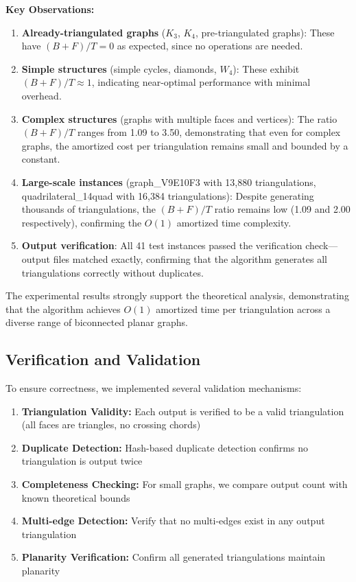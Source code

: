 \documentclass[12pt,a4paper]{article}
\theoremstyle{definition}
\theoremstyle{remark}
\begin{document}
\textbf{Key Observations:}
\begin{enumerate}
    \item \textbf{Already-triangulated graphs} ($K_3$, $K_4$, pre-triangulated graphs): These have $(B+F)/T = 0$ as expected, since no operations are needed.
    
    \item \textbf{Simple structures} (simple cycles, diamonds, $W_4$): These exhibit $(B+F)/T \approx 1$, indicating near-optimal performance with minimal overhead.
    
    \item \textbf{Complex structures} (graphs with multiple faces and vertices): The ratio $(B+F)/T$ ranges from 1.09 to 3.50, demonstrating that even for complex graphs, the amortized cost per triangulation remains small and bounded by a constant.
    
    \item \textbf{Large-scale instances} (graph\_V9E10F3 with 13,880 triangulations, quadrilateral\_14quad with 16,384 triangulations): Despite generating thousands of triangulations, the $(B+F)/T$ ratio remains low (1.09 and 2.00 respectively), confirming the $O(1)$ amortized time complexity.
    
    \item \textbf{Output verification}: All 41 test instances passed the verification check—output files matched exactly, confirming that the algorithm generates all triangulations correctly without duplicates.
\end{enumerate}

The experimental results strongly support the theoretical analysis, demonstrating that the algorithm achieves $O(1)$ amortized time per triangulation across a diverse range of biconnected planar graphs.

\subsection{Verification and Validation}

To ensure correctness, we implemented several validation mechanisms:

\begin{enumerate}
    \item \textbf{Triangulation Validity:} Each output is verified to be a valid triangulation (all faces are triangles, no crossing chords)
    \item \textbf{Duplicate Detection:} Hash-based duplicate detection confirms no triangulation is output twice
    \item \textbf{Completeness Checking:} For small graphs, we compare output count with known theoretical bounds
    \item \textbf{Multi-edge Detection:} Verify that no multi-edges exist in any output triangulation
    \item \textbf{Planarity Verification:} Confirm all generated triangulations maintain planarity
\end{enumerate}
\end{document}
